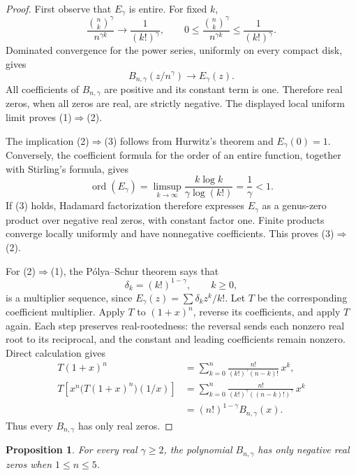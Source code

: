 \documentclass[11pt,a4paper]{article}
\newtheorem{proposition}[theorem]{Proposition}
\theoremstyle{remark}
\begin{document}
\begin{proof}
First observe that $E_\gamma$ is entire.  For fixed $k$,
\[
 \frac{\binom nk^\gamma}{n^{\gamma k}}
       \longrightarrow\frac1{(k!)^\gamma},
 \qquad
 0\le\frac{\binom nk^\gamma}{n^{\gamma k}}
       \le\frac1{(k!)^\gamma}.
\]
Dominated convergence for the power series, uniformly on every compact
disk, gives
\[
 B_{n,\gamma}(z/n^\gamma)\longrightarrow E_\gamma(z).
\]
All coefficients of $B_{n,\gamma}$ are positive and its constant term is
one.  Therefore real zeros, when all zeros are real, are strictly
negative.  The displayed local uniform limit proves (1)$\Rightarrow$(2).

The implication (2)$\Rightarrow$(3) follows from Hurwitz's theorem and
$E_\gamma(0)=1$.  Conversely, the coefficient formula for the order of an
entire function, together with Stirling's formula, gives
\[
 \operatorname{ord}(E_\gamma)
 =\limsup_{k\to\infty}\frac{k\log k}{\gamma\log(k!)}
 =\frac1\gamma<1.
\]
If (3) holds, Hadamard factorization therefore expresses $E_\gamma$ as
a genus-zero product over negative real zeros, with constant factor one.
Finite products converge locally uniformly and have nonnegative
coefficients.  This proves (3)$\Rightarrow$(2).

For (2)$\Rightarrow$(1), the P\'olya--Schur theorem says that
\[
 \delta_k=(k!)^{1-\gamma},\qquad k\ge0,
\]
is a multiplier sequence, since
$E_\gamma(z)=\sum\delta_k z^k/k!$.  Let $T$ be the corresponding
coefficient multiplier.  Apply $T$ to $(1+x)^n$, reverse its
coefficients, and apply $T$ again.  Each step preserves real-rootedness:
the reversal sends each nonzero real root to its reciprocal, and the
constant and leading coefficients remain nonzero.  Direct calculation
gives
\begin{align*}
 T(1+x)^n
   &=\sum_{k=0}^n\frac{n!}{(k!)^\gamma(n-k)!}\,x^k,\\
 T\left[x^n\bigl(T(1+x)^n\bigr)(1/x)\right]
   &=\sum_{k=0}^n\frac{n!}{(k!)^\gamma((n-k)!)^\gamma}\,x^k\\
   &=(n!)^{1-\gamma}B_{n,\gamma}(x).
\end{align*}
Thus every $B_{n,\gamma}$ has only real zeros.
\end{proof}

\begin{proposition}
For every real $\gamma\ge2$, the polynomial $B_{n,\gamma}$ has only
negative real zeros when $1\le n\le5$.
\end{proposition}
\end{document}
